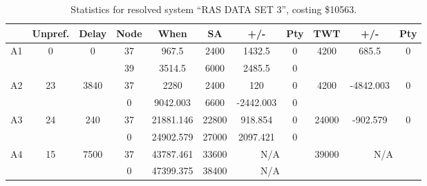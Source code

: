 \begin{sidewaystable}
\footnotesize
\caption{Statistics for resolved system ``RAS DATA SET 3'', costing \$10563.}
\centering
\begin{tabular}{c||c|c||c|c|c|c|c||c|c|c}
  \hline \hline
  &
  Unpref. & 
  Delay &
  Node &
  When &
  SA &
  +/- &
  Pty &
  TWT &
  +/- &
  Pty \\
      \hline
      \multirow{2}{*}{A1} &
      \multirow{2}{*}{0} &
      \multirow{2}{*}{0} &
      37 &
      967.5 &
      2400 &
        1432.5 &
        0 &
      \multirow{2}{*}{4200} &
        \multirow{2}{*}{685.5} &
        \multirow{2}{*}{0}
      \\
      \cline{4-8}
       &
       &
       &
      39 &
      3514.5 &
      6000 &
        2485.5 &
        0 &
      
         &
        
      \\
      \hline
      \multirow{2}{*}{A2} &
      \multirow{2}{*}{23} &
      \multirow{2}{*}{3840} &
      37 &
      2280 &
      2400 &
        120 &
        0 &
      \multirow{2}{*}{4200} &
        \multirow{2}{*}{-4842.003} &
        \multirow{2}{*}{0}
      \\
      \cline{4-8}
       &
       &
       &
      0 &
      9042.003 &
      6600 &
        -2442.003 &
        0 &
      
         &
        
      \\
      \hline
      \multirow{2}{*}{A3} &
      \multirow{2}{*}{24} &
      \multirow{2}{*}{240} &
      37 &
      21881.146 &
      22800 &
        918.854 &
        0 &
      \multirow{2}{*}{24000} &
        \multirow{2}{*}{-902.579} &
        \multirow{2}{*}{0}
      \\
      \cline{4-8}
       &
       &
       &
      0 &
      24902.579 &
      27000 &
        2097.421 &
        0 &
      
         &
        
      \\
      \hline
      \multirow{2}{*}{A4} &
      \multirow{2}{*}{15} &
      \multirow{2}{*}{7500} &
      37 &
      43787.461 &
      33600 &
        \multicolumn{2}{|c||}{N/A} &
      \multirow{2}{*}{39000} &
        \multicolumn{2}{c}{\multirow{2}{*}{N/A}}
      \\
      \cline{4-8}
       &
       &
       &
      0 &
      47399.375 &
      38400 &
        \multicolumn{2}{|c||}{N/A} &
      

\end{tabular}
\end{sidewaystable}
